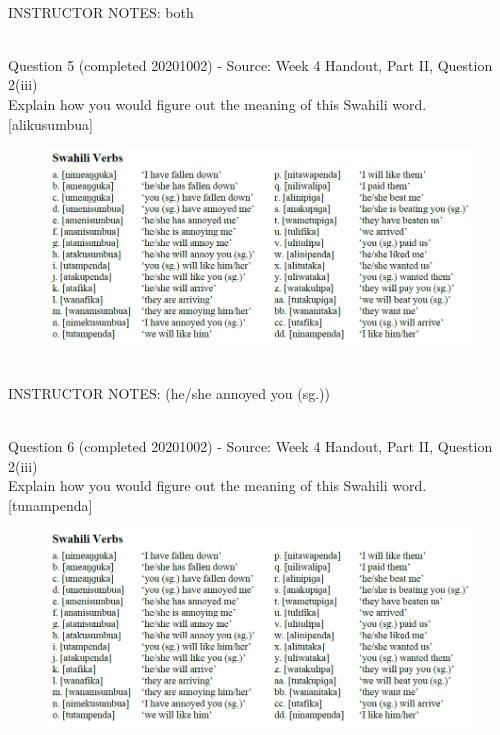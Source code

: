 \documentclass[12pt]{article}
\begin{document}
~\\
INSTRUCTOR NOTES: both


~\\

{\large Question 5} (completed 20201002) - Source: Week 4 Handout, Part II, Question 2(iii)\\

Explain how you would figure out the meaning of this Swahili word.\\

{[alikusumbua]}

\begin{figure}[H]
\includegraphics{../images/swahiliverbs.png}
\end{figure}

~\\
INSTRUCTOR NOTES: (he/she annoyed you (sg.))


~\\

{\large Question 6} (completed 20201002) - Source: Week 4 Handout, Part II, Question 2(iii)\\

Explain how you would figure out the meaning of this Swahili word.\\

{[tunampenda]}

\begin{figure}[H]
\includegraphics{../images/swahiliverbs.png}
\end{figure}
\end{document}

